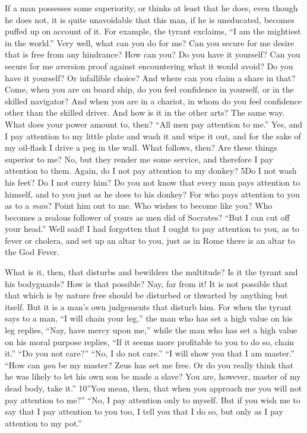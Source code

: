 If a man possesses some superiority, or thinks at least that he does, even though he does not, it is quite unavoidable that this man, if he is uneducated, becomes puffed up on account of it. For example, the tyrant exclaims, ``I am the mightiest in the world.'' Very well, what can you do for me? Can you secure for me desire that is free from any hindrance? How can you? Do you have it yourself? Can you secure for me aversion proof against encountering what it would avoid? Do you have it yourself? Or infallible choice? And where can you claim a share in that? Come, when you are on board ship, do you feel confidence in yourself, or in the skilled navigator? And when you are in a chariot, in whom do you feel confidence other than the skilled driver. And how is it in the other arts? The same way. What does your power amount to, then? ``All men pay attention to me.'' Yes, and I pay attention to my little plate and wash it and wipe it out, and for the sake of my oil-flask I drive a peg in the wall. What follows, then? Are these things superior to me? No, but they render me some service, and therefore I pay attention to them. Again, do I not pay attention to my donkey? 5Do I not wash his feet? Do I not curry him? Do you not know that every man pays attention to himself, and to you just as he does to his donkey? For who pays attention to you as to a \emph{man}? Point him out to me. Who wishes to become like you? Who becomes a zealous follower of yours as men did of Socrates? ``But I can cut off your head.'' Well said! I had forgotten that I ought to pay attention to you, as to fever or cholera, and set up an altar to you, just as in Rome there is an altar to the God Fever.

What is it, then, that disturbs and bewilders the multitude? Is it the tyrant and his bodyguards? How is that possible? Nay, far from it! It is not possible that that which is by nature free should be disturbed or thwarted by anything but itself. But it is a man's own judgements that disturb him. For when the tyrant says to a man, ``I will chain your leg,'' the man who has set a high value on his leg replies, ``Nay, have mercy upon me,'' while the man who has set a high value on his moral purpose replies, ``If it seems more profitable to you to do so, chain it.'' ``Do you not care?'' ``No, I do not care.'' ``I will show you that I am master.'' ``How can \emph{you} be my master? Zeus has set me free. Or do you really think that he was likely to let his own son be made a slave? You are, however, master of my dead body, take it.'' 10''You mean, then, that when you approach me you will not pay attention to me?'' ``No, I pay attention only to myself. But if you wish me to say that I pay attention to you too, I tell you that I do so, but only as I pay attention to my pot.''

